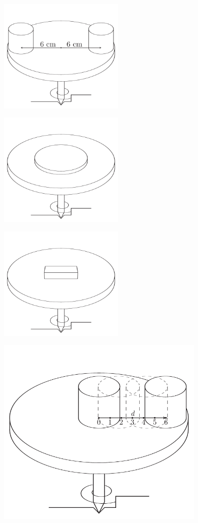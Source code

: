 \documentclass[12pt,a4paper]{article}
\begin{document}
\includegraphics[width=6cm]{illustration12.pdf}

\includegraphics[width=6cm]{illustration21.pdf}

\includegraphics[width=6cm]{illustration22.pdf}

\includegraphics[width=10cm]{illustration3.pdf}
\end{document}
